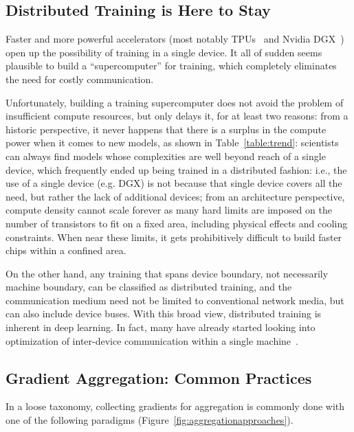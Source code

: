 \subsection{Distributed Training is Here to Stay}
Faster and more powerful accelerators (most notably TPUs~\cite{Jouppi:2017:IPA:3079856.3080246} and Nvidia DGX~\cite{AIResear61:online}) open up the possibility of training in a single device. It all of sudden seems plausible to build a ``supercomputer'' for training, which completely eliminates the need for costly communication. 

Unfortunately, building a training supercomputer does not avoid the problem of insufficient compute resources, but only delays it, for at least two reasons: from a historic perspective, it never happens that there is a surplus in the compute power when it comes to new models, as shown in Table~\ref{table:trend}: scientists can always find models whose complexities are well beyond reach of a single device, which frequently ended up being trained in a distributed fashion: i.e., the use of a single device (e.g. DGX) is not because that single device covers all the need, but rather the lack of additional devices; from an architecture perspective, compute density cannot scale forever as many hard limits are imposed on the number of transistors to fit on a fixed area, including physical effects and cooling constraints. When near these limits, it gets prohibitively difficult to build faster chips within a confined area. 

On the other hand, any training that spans device boundary, not necessarily machine boundary, can be classified as distributed training, and the communication medium need not be limited to conventional network media, but can also include device buses. With this broad view, distributed training is inherent in deep learning. In fact, many have already started looking into optimization of inter-device communication within a single machine~\cite{wang2019blink}. %

\subsection{Gradient Aggregation: Common Practices}
In a loose taxonomy, collecting gradients for aggregation is commonly done with one of the following paradigms (Figure~\ref{fig:aggregationapproaches}).


